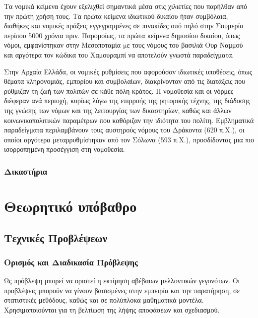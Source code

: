 \documentclass[diploma]{softlab-thesis}
\begin{document}
Τα νομικά κείμενα έχουν εξελιχθεί σημαντικά μέσα στις χιλιετίες που παρήλθαν από την πρώτη χρήση τους. Τα πρώτα κείμενα ιδιωτικού δικαίου ήταν συμβόλαια, διαθήκες και νομικές πράξεις εγγεγραμμένες σε πινακίδες από πηλό στην Σουμερία περίπου 5000 χρόνια πριν. Παρομοίως, τα πρώτα κείμενα δημοσίου δικαίου, όπως νόμοι, εμφανίστηκαν στην Μεσοποταμία µε τους νόμους του βασιλιά Ουρ Ναμμού και αργότερα τον κώδικα του Χαμουραμπί να αποτελούν γνωστά παραδείγματα. 

Στην Αρχαία Ελλάδα, οι νομικές ρυθμίσεις που αφορούσαν ιδιωτικές υποθέσεις, όπως θέματα κληρονομιάς, εμπορίου και συμβολαίων, διακρίνονταν από τις διατάξεις που ρύθμιζαν τη ζωή των πολιτών σε κάθε πόλη-κράτος. Η νομοθεσία και οι νόρμες διέφεραν ανά περιοχή, κυρίως λόγω της επιρροής της ρητορικής τέχνης, της διάδοσης της γνώσης των νόμων και της λειτουργίας των δικαστηρίων, καθώς και άλλων κοινωνικοπολιτικών παραμέτρων που καθόριζαν την ιδιότητα του πολίτη. Εμβληματικά παραδείγματα περιλαμβάνουν τους αυστηρούς νόμους του Δράκοντα (620 π.Χ.), οι οποίοι αργότερα μεταρρυθμίστηκαν από τον Σόλωνα (593 π.Χ.), προσδίδοντας μια πιο ισορροπημένη προσέγγιση στη νομοθεσία. 

\subsection{Δικαστήρια}







\chapter{Θεωρητικό υπόβαθρο}

\section{Τεχνικές Προβλέψεων}

\subsection{Ορισμός και Διαδικασία Πρόβλεψης}

Ως πρόβλεψη μπορεί να οριστεί η εκτίμηση αβέβαιων μελλοντικών γεγονότων. Οι προβλέψεις μπορούν να γίνουν βασισμένες στην εμπειρία και την παρατήρηση, σε στατιστικές μεθόδους, καθώς και σε πολύπλοκα μαθηματικά μοντέλα. Χρησιμοποιούνται για τη βελτίωση της λήψης αποφάσεων και σχεδιασμού. 
\end{document}

